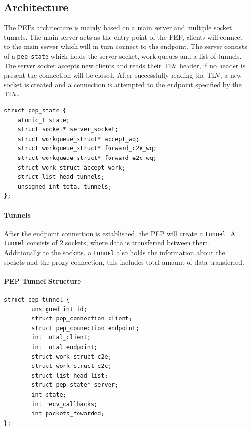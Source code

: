 \documentclass[a4paper,english, 11pt]{report}
\begin{document}
\subsection{Architecture}
The PEPs architecture is mainly based on a main server and multiple socket tunnels. The main server acts as the entry point of the PEP, clients will connect to the main server which will in turn connect to the endpoint. The server consists of a \verb|pep_state| which holds the server socket, work queues and a list of tunnels. The server socket accepts new clients and reads their TLV header, if no header is present the connection will be closed. After successfully reading the TLV, a new socket is created and a connection is attempted to the endpoint specified by the TLVs.\\

\noindent\begin{minipage}{\linewidth}
\begin{verbatim}
struct pep_state {
    atomic_t state;
    struct socket* server_socket;
    struct workqueue_struct* accept_wq;
    struct workqueue_struct* forward_c2e_wq;
    struct workqueue_struct* forward_e2c_wq;
    struct work_struct accept_work;
    struct list_head tunnels;
    unsigned int total_tunnels;
};
\end{verbatim}
\label{fig:pep_state_structure}
\end{minipage}

\paragraph{Tunnels}
After the endpoint connection is established, the PEP will create a \verb|tunnel|. A \verb|tunnel| consists of 2 sockets, where data is transferred between them. Additionally to the sockets, a \verb|tunnel| also holds the information about the sockets and the proxy connection, this includes total amount of data transferred.\\

\noindent\begin{minipage}{\linewidth}
\paragraph{PEP Tunnel Structure}
\begin{verbatim}
struct pep_tunnel {
        unsigned int id;
        struct pep_connection client;
        struct pep_connection endpoint;
        int total_client;
        int total_endpoint;
        struct work_struct c2e;
        struct work_struct e2c;
        struct list_head list;
        struct pep_state* server;
        int state;
        int recv_callbacks;
        int packets_fowarded;
};
\end{verbatim}
\end{minipage}
\end{document}
